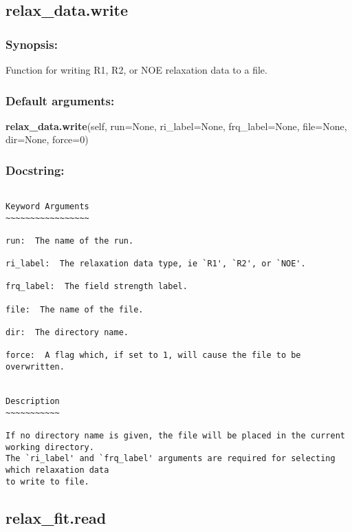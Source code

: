 \newpage

\subsection{relax\_data.write}


\subsubsection{Synopsis:}

Function for writing R1, R2, or NOE relaxation data to a file.

\subsubsection{Default arguments:}

\textsf{\textbf{relax\_data.write}(self, run=None, ri\_label=None, frq\_label=None, file=None, dir=None, force=0)
}


\subsubsection{Docstring:}

{\scriptsize
\begin{verbatim}

Keyword Arguments
~~~~~~~~~~~~~~~~~

run:  The name of the run.

ri_label:  The relaxation data type, ie `R1', `R2', or `NOE'.

frq_label:  The field strength label.

file:  The name of the file.

dir:  The directory name.

force:  A flag which, if set to 1, will cause the file to be overwritten.


Description
~~~~~~~~~~~

If no directory name is given, the file will be placed in the current working directory.
The `ri_label' and `frq_label' arguments are required for selecting which relaxation data
to write to file.
\end{verbatim}
}



\newpage

\subsection{relax\_fit.read}


